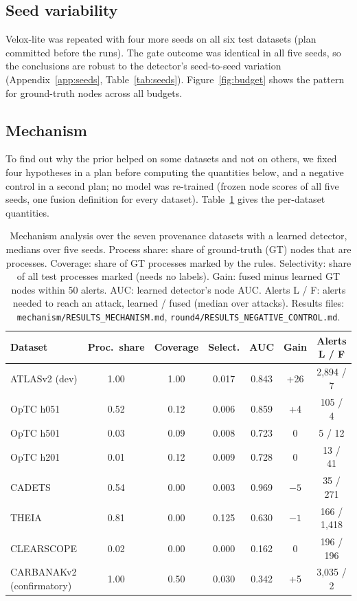 \documentclass[acmlarge,screen,review]{acmart}
\begin{document}
\subsection{Seed variability}
Velox-lite was repeated with four more seeds on all six test datasets (plan committed before the runs). The gate
outcome was identical in all five seeds, so the conclusions are robust to the detector's seed-to-seed variation
(Appendix~\ref{app:seeds}, Table~\ref{tab:seeds}). Figure~\ref{fig:budget} shows the pattern for ground-truth nodes
across all budgets.

\subsection{Mechanism}
To find out why the prior helped on some datasets and not on others, we fixed four hypotheses in a plan before
computing the quantities below, and a negative control in a second plan; no model was re-trained (frozen node scores of all five seeds, one fusion definition
for every dataset). Table~\ref{tab:mech} gives the per-dataset quantities.
\begin{table}[!htbp]
\centering\footnotesize
\caption{Mechanism analysis over the seven provenance datasets with a learned detector, medians over five seeds.
Process share: share of ground-truth (GT) nodes that are processes. Coverage: share of GT processes marked by the
rules. Selectivity: share of all test processes marked (needs no labels). Gain: fused minus learned GT nodes within
50 alerts. AUC: learned detector's node AUC. Alerts L / F: alerts needed to reach an attack, learned / fused (median over
attacks). Results files: \texttt{mechanism/RESULTS\_MECHANISM.md}, \texttt{round4/RESULTS\_NEGATIVE\_CONTROL.md}.}
\label{tab:mech}
\setlength{\tabcolsep}{3pt}
\begin{tabular}{lcccccc}
\toprule
Dataset & Proc.\ share & Coverage & Select. & AUC & Gain & Alerts L / F \\
\midrule
ATLASv2 (dev) & 1.00 & 1.00 & 0.017 & 0.843 & +26 & 2{,}894 / 7 \\
OpTC h051 & 0.52 & 0.12 & 0.006 & 0.859 & +4 & 105 / 4 \\
OpTC h501 & 0.03 & 0.09 & 0.008 & 0.723 & 0 & 5 / 12 \\
OpTC h201 & 0.01 & 0.12 & 0.009 & 0.728 & 0 & 13 / 41 \\
CADETS & 0.54 & 0.00 & 0.003 & 0.969 & $-5$ & 35 / 271 \\
THEIA & 0.81 & 0.00 & 0.125 & 0.630 & $-1$ & 166 / 1{,}418 \\
CLEARSCOPE & 0.02 & 0.00 & 0.000 & 0.162 & 0 & 196 / 196 \\
\midrule
CARBANAKv2 (confirmatory) & 1.00 & 0.50 & 0.030 & 0.342 & +5 & 3{,}035 / 2 \\
\bottomrule
\end{tabular}
\end{table}
\end{document}
